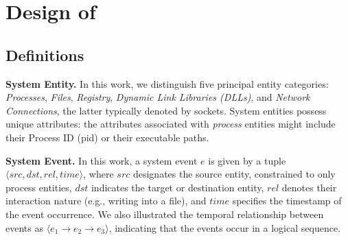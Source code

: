 \section{Design of \tool}


\subsection{Definitions}\label{sec:toolDefs}

\noindent
{\bf System Entity.} In this work, we distinguish five principal entity categories: \textit{Processes}, \textit{Files}, \textit{Registry}, \textit{Dynamic Link Libraries (DLLs)}, and \textit{Network Connections}, the latter typically denoted by sockets. System entities possess unique attributes: the attributes associated with \textit{process} entities might include their Process ID (pid) or their executable paths. 

\noindent
{\bf System Event.} In this work, a system event $e$ is given by a tuple $\langle src, dst, rel, time\rangle$, where $src$ designates the source entity, constrained to only process entities, $dst$ indicates the target or destination entity, $rel$ denotes their interaction nature (e.g., writing into a file), and $time$ specifies the timestamp of the event occurrence.
We also illustrated the temporal relationship between events as $\langle e_1 \to e_2 \to e_3 \rangle$, indicating that the events occur in a logical sequence. 

